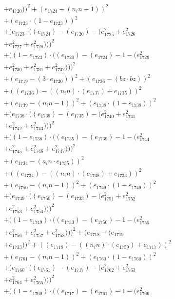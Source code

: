 \documentclass[10pt, a4paper]{article}
\begin{document}
\begin{small}
\begin{align*}
& + e_{1720}))^{2} + (e_{1724} - (n_in - 1))^{2} \\
& + (e_{1723}  \cdot  (1 - e_{1723}))^{2} \\
& + (e_{1723}  \cdot  ((e_{1724}) - (e_{1720}) - (e_{1725}^{2} + e_{1726}^{2} \\
& + e_{1727}^{2} + e_{1728}^{2})))^{2} \\
& + ((1 - e_{1723})  \cdot  ((e_{1720}) - (e_{1724}) - 1 - (e_{1729}^{2} \\
& + e_{1730}^{2} + e_{1731}^{2} + e_{1732}^{2})))^{2} \\
& + (e_{1719} - (3  \cdot  e_{1720}))^{2} + (e_{1736} - (bz  \cdot  bz))^{2} \\
& + ((e_{1736}) - ((n_in)  \cdot  (e_{1737}) + e_{1735}))^{2} \\
& + (e_{1739} - (n_in - 1))^{2} + (e_{1738}  \cdot  (1 - e_{1738}))^{2} \\
& + (e_{1738}  \cdot  ((e_{1739}) - (e_{1735}) - (e_{1740}^{2} + e_{1741}^{2} \\
& + e_{1742}^{2} + e_{1743}^{2})))^{2} \\
& + ((1 - e_{1738})  \cdot  ((e_{1735}) - (e_{1739}) - 1 - (e_{1744}^{2} \\
& + e_{1745}^{2} + e_{1746}^{2} + e_{1747}^{2})))^{2} \\
& + (e_{1734} - (a_in  \cdot  e_{1735}))^{2} \\
& + ((e_{1734}) - ((n_in)  \cdot  (e_{1748}) + e_{1733}))^{2} \\
& + (e_{1750} - (n_in - 1))^{2} + (e_{1749}  \cdot  (1 - e_{1749}))^{2} \\
& + (e_{1749}  \cdot  ((e_{1750}) - (e_{1733}) - (e_{1751}^{2} + e_{1752}^{2} \\
& + e_{1753}^{2} + e_{1754}^{2})))^{2} \\
& + ((1 - e_{1749})  \cdot  ((e_{1733}) - (e_{1750}) - 1 - (e_{1755}^{2} \\
& + e_{1756}^{2} + e_{1757}^{2} + e_{1758}^{2})))^{2} + (e_{1718} - (e_{1719} \\
& + e_{1733}))^{2} + ((e_{1718}) - ((n_in)  \cdot  (e_{1759}) + e_{1717}))^{2} \\
& + (e_{1761} - (n_in - 1))^{2} + (e_{1760}  \cdot  (1 - e_{1760}))^{2} \\
& + (e_{1760}  \cdot  ((e_{1761}) - (e_{1717}) - (e_{1762}^{2} + e_{1763}^{2} \\
& + e_{1764}^{2} + e_{1765}^{2})))^{2} \\
& + ((1 - e_{1760})  \cdot  ((e_{1717}) - (e_{1761}) - 1 - (e_{1766}^{2} \\

\end{align*}
\end{small}
\end{document}
